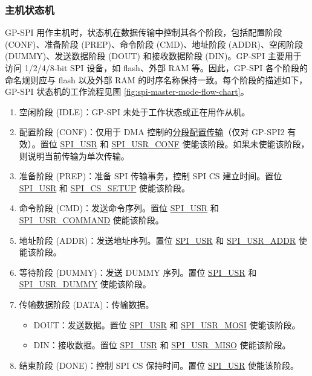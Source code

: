 \documentclass[main\_\_CN.tex]{subfiles}
\begin{document}
\subsubsection{主机状态机}
\label{sec:gp-spi2-state-machine}

GP-SPI 用作主机时，状态机在数据传输中控制其各个阶段，包括配置阶段 (CONF)、准备阶段 (PREP)、命令阶段 (CMD)、地址阶段 (ADDR)、空闲阶段 (DUMMY)、发送数据阶段 (DOUT) 和接收数据阶段 (DIN)。GP-SPI 主要用于访问 1/2/4/8-bit SPI 设备，如 flash、外部 RAM 等。因此，GP-SPI 各个阶段的命名规则应与 flash 以及外部 RAM 的时序名称保持一致。每个阶段的描述如下，GP-SPI 状态机的工作流程见图 \ref{fig:spi-master-mode-flow-chart}。

\begin{enumerate}
    \item 空闲阶段 (IDLE)：GP-SPI 未处于工作状态或正在用作从机。
    \item 配置阶段 (CONF)：仅用于 DMA 控制的\hyperref[sec:gp-spi-dma-seg-conf-trans]{分段配置传输}（仅对 GP-SPI2 有效）。置位 \hyperref[fielddesc:SPIUSR]{SPI\_USR} 和 \hyperref[fielddesc:SPIUSRCONF]{SPI\_USR\_CONF} 使能该阶段。如果未使能该阶段，则说明当前传输为单次传输。 
    \item 准备阶段 (PREP)：准备 SPI 传输事务，控制 SPI CS 建立时间。置位 \hyperref[fielddesc:SPIUSR]{SPI\_USR} 和 \hyperref[fielddesc:SPICSSETUP]{SPI\_CS\_SETUP} 使能该阶段。 
    \item\label{phase:cmd} 命令阶段 (CMD)：发送命令序列。置位 \hyperref[fielddesc:SPIUSR]{SPI\_USR} 和 \hyperref[fielddesc:SPIUSRCOMMAND]{SPI\_USR\_COMMAND} 使能该阶段。 
    \item\label{phase:addr} 地址阶段 (ADDR)：发送地址序列。置位 \hyperref[fielddesc:SPIUSR]{SPI\_USR} 和 \hyperref[fielddesc:SPIUSRADDR]{SPI\_USR\_ADDR} 使能该阶段。 
    \item 等待阶段 (DUMMY)：发送 DUMMY 序列。置位 \hyperref[fielddesc:SPIUSR]{SPI\_USR} 和 \hyperref[fielddesc:SPIUSRDUMMY]{SPI\_USR\_DUMMY} 使能该阶段。 
    \item\label{phase:data} 传输数据阶段 (DATA)：传输数据。
    \begin{itemize}
    \item DOUT：发送数据。置位 \hyperref[fielddesc:SPIUSR]{SPI\_USR} 和 \hyperref[fielddesc:SPIUSRMOSI]{SPI\_USR\_MOSI} 使能该阶段。 
    \item DIN：接收数据。置位 \hyperref[fielddesc:SPIUSR]{SPI\_USR} 和 \hyperref[fielddesc:SPIUSRMISO]{SPI\_USR\_MISO} 使能该阶段。 
    \end{itemize}
    \item 结束阶段 (DONE)：控制 SPI CS 保持时间。置位 \hyperref[fielddesc:SPIUSR]{SPI\_USR} 使能该阶段。 
\end{enumerate}
\end{document}
